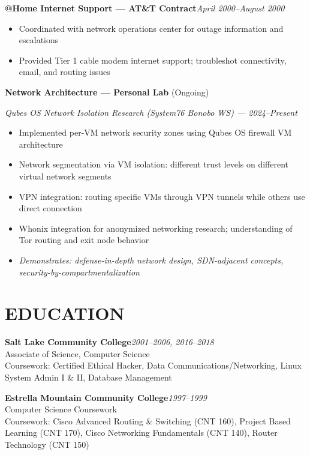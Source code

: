 \documentclass[9pt,letterpaper]{extarticle}
\begin{document}
\textbf{@Home Internet Support --- AT\&T Contract}\hfill\textit{April 2000--August 2000}
\begin{itemize}
  \item Coordinated with network operations center for outage information and escalations
  \item Provided Tier 1 cable modem internet support; troubleshot connectivity, email, and routing issues
\end{itemize}

\vspace{5pt}
\noindent\textbf{Network Architecture --- Personal Lab} (Ongoing)

\smallskip\textit{Qubes OS Network Isolation Research (System76 Bonobo WS) --- 2024--Present}
\begin{itemize}
  \item Implemented per-VM network security zones using Qubes OS firewall VM architecture
  \item Network segmentation via VM isolation: different trust levels on different virtual network segments
  \item VPN integration: routing specific VMs through VPN tunnels while others use direct connection
  \item Whonix integration for anonymized networking research; understanding of Tor routing and exit node behavior
  \item \textit{Demonstrates: defense-in-depth network design, SDN-adjacent concepts, security-by-compartmentalization}
\end{itemize}

\section*{EDUCATION}

\noindent\textbf{Salt Lake Community College}\hfill\textit{2001--2006, 2016--2018}\\
Associate of Science, Computer Science\\
Coursework: Certified Ethical Hacker, Data Communications/Networking, Linux System Admin I \& II, Database Management

\vspace{4pt}
\noindent\textbf{Estrella Mountain Community College}\hfill\textit{1997--1999}\\
Computer Science Coursework\\
Coursework: Cisco Advanced Routing \& Switching (CNT 160), Project Based Learning (CNT 170), Cisco Networking Fundamentals (CNT 140), Router Technology (CNT 150)
\end{document}
